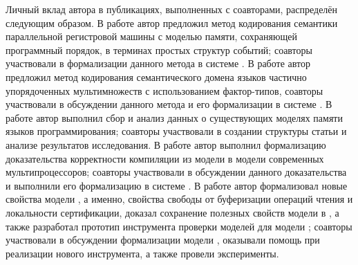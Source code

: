 
Личный вклад автора в публикациях, выполненных с соавторами, распределён следующим образом.
В работе \cite{Gladstein-al:ISPRAS21} автор предложил
метод кодирования семантики параллельной регистровой машины с
моделью памяти, сохраняющей программный порядок, в терминах простых структур событий;
соавторы участвовали в формализации данного метода в системе \coq.
В работе \cite{Moiseenko-al:STJITMO22} автор предложил
метод кодирования семантического домена языков частично упорядоченных мультимножеств
с использованием фактор-типов, 
соавторы участвовали в обсуждении данного метода и его формализации в системе \coq.
В работе \cite{Moiseenko-al:PCS21} автор выполнил сбор и анализ данных
о существующих моделях памяти языков программирования;
соавторы участвовали в создании структуры статьи и анализе результатов исследования. 
В работе \cite{Moiseenko-al:ECOOP20} автор выполнил
формализацию доказательства корректности компиляции из
модели \Wkm в модели современных мультипроцессоров;
соавторы участвовали в обсуждении данного доказательства
и выполнили его формализацию в системе \coq.
В работе \cite{Moiseenko-al:OOPSLA22} автор
формализовал новые свойства модели \WkmS,
а именно, свойства свободы от буферизации операций чтения и локальности сертификации,
доказал сохранение полезных свойств модели \Wkm в \WkmS,
а также разработал прототип инструмента проверки моделей \wmc 
для модели \WkmS; соавторы участвовали в обсуждении формализации модели \WkmS, оказывали помощь при реализации нового инструмента,
а также провели эксперименты.
